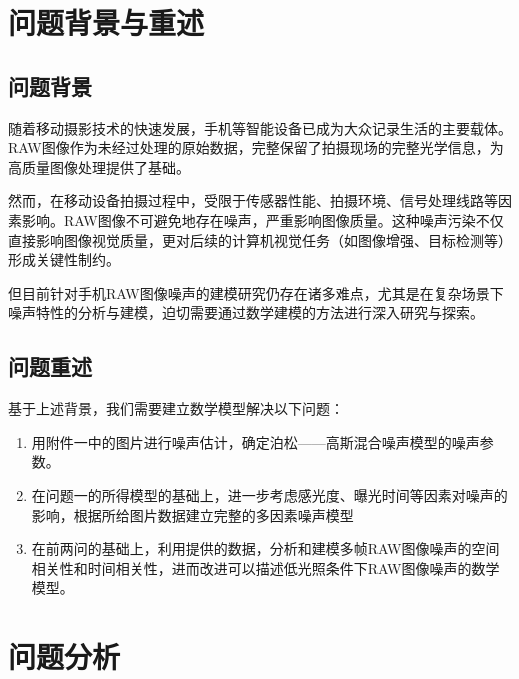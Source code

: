 \documentclass[a4paper]{article}
\begin{document}
	\clearpage %
	
	\section{问题背景与重述}
	\subsection{问题背景}
     随着移动摄影技术的快速发展，手机等智能设备已成为大众记录生活的主要载体。RAW图像作为未经过处理的原始数据，完整保留了拍摄现场的完整光学信息，为高质量图像处理提供了基础。
	 \par
	 然而，在移动设备拍摄过程中，受限于传感器性能、拍摄环境、信号处理线路等因素影响。RAW图像不可避免地存在噪声，严重影响图像质量。这种噪声污染不仅直接影响图像视觉质量，更对后续的计算机视觉任务（如图像增强、目标检测等）形成关键性制约。
	 \par
	 但目前针对手机RAW图像噪声的建模研究仍存在诸多难点，尤其是在复杂场景下噪声特性的分析与建模，迫切需要通过数学建模的方法进行深入研究与探索。
	
	
	\subsection{问题重述}
	
	基于上述背景，我们需要建立数学模型解决以下问题：

	\begin{enumerate}[itemindent=0.5cm]
		\item 用附件一中的图片进行噪声估计，确定泊松——高斯混合噪声模型的噪声参数。
		\item 在问题一的所得模型的基础上，进一步考虑感光度、曝光时间等因素对噪声的影响，根据所给图片数据建立完整的多因素噪声模型
		\item 在前两问的基础上，利用提供的数据，分析和建模多帧RAW图像噪声的空间相关性和时间相关性，进而改进可以描述低光照条件下RAW图像噪声的数学模型。
	\end{enumerate}
	
	\section{问题分析}
\end{document}
